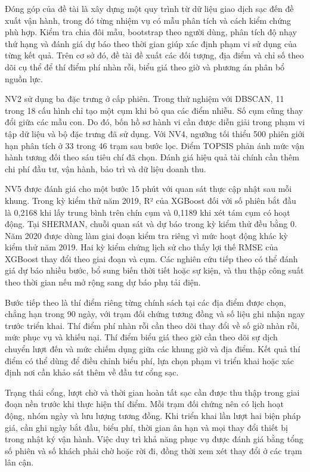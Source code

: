 \documentclass[conference,a4paper]{IEEEtran}
\begin{document}
Đóng góp của đề tài là xây dựng một quy trình từ dữ liệu giao dịch sạc đến đề xuất vận hành, trong đó từng nhiệm vụ có mẫu phân tích và cách kiểm chứng phù hợp. Kiểm tra chia đôi mẫu, bootstrap theo người dùng, phân tích độ nhạy thứ hạng và đánh giá dự báo theo thời gian giúp xác định phạm vi sử dụng của từng kết quả. Trên cơ sở đó, đề tài đề xuất các đối tượng, địa điểm và chỉ số theo dõi cụ thể để thí điểm phí nhàn rỗi, biểu giá theo giờ và phương án phân bổ nguồn lực.

NV2 sử dụng ba đặc trưng ở cấp phiên. Trong thử nghiệm với DBSCAN, 11 trong 18 cấu hình chỉ tạo một cụm khi bỏ qua các điểm nhiễu. Số cụm cũng thay đổi giữa các mẫu con. Do đó, bốn hồ sơ hành vi cần được diễn giải trong phạm vi tập dữ liệu và bộ đặc trưng đã sử dụng. Với NV4, ngưỡng tối thiểu 500 phiên giới hạn phân tích ở 33 trong 46 trạm sau bước lọc. Điểm TOPSIS phản ánh mức vận hành tương đối theo sáu tiêu chí đã chọn. Đánh giá hiệu quả tài chính cần thêm chi phí đầu tư, vận hành, bảo trì và dữ liệu doanh thu.

NV5 được đánh giá cho một bước 15 phút với quan sát thực cập nhật sau mỗi khung. Trong kỳ kiểm thử năm 2019, R² của XGBoost đối với số phiên bắt đầu là 0,2168 khi lấy trung bình trên chín cụm và 0,1189 khi xét tám cụm có hoạt động. Tại SHERMAN, chuỗi quan sát và dự báo trong kỳ kiểm thử đều bằng 0. Năm 2020 được dùng làm giai đoạn kiểm tra riêng vì mức hoạt động khác kỳ kiểm thử năm 2019. Hai kỳ kiểm chứng lịch sử cho thấy lợi thế RMSE của XGBoost thay đổi theo giai đoạn và cụm. Các nghiên cứu tiếp theo có thể đánh giá dự báo nhiều bước, bổ sung biến thời tiết hoặc sự kiện, và thu thập công suất theo thời gian nếu mở rộng sang dự báo phụ tải điện.

Bước tiếp theo là thí điểm riêng từng chính sách tại các địa điểm được chọn, chẳng hạn trong 90 ngày, với trạm đối chứng tương đồng và số liệu ghi nhận ngay trước triển khai. Thí điểm phí nhàn rỗi cần theo dõi thay đổi về số giờ nhàn rỗi, mức phục vụ và khiếu nại. Thí điểm biểu giá theo giờ cần theo dõi sự dịch chuyển lượt đến và mức chiếm dụng giữa các khung giờ và địa điểm. Kết quả thí điểm có thể dùng để điều chỉnh biểu phí, lựa chọn phạm vi triển khai hoặc xác định nơi cần khảo sát thêm về đầu tư cổng sạc.

Trạng thái cổng, lượt chờ và thời gian hoàn tất sạc cần được thu thập trong giai đoạn nền trước khi thực hiện thí điểm. Mỗi trạm đối chứng nên có lịch hoạt động, nhóm ngày và lưu lượng tương đồng. Khi triển khai lần lượt hai biện pháp giá, cần ghi ngày bắt đầu, biểu phí, thời gian ân hạn và mọi thay đổi thiết bị trong nhật ký vận hành. Việc duy trì khả năng phục vụ được đánh giá bằng tổng số phiên và số khách phải chờ hoặc rời đi, đồng thời xem xét thay đổi ở các trạm lân cận.
\end{document}
